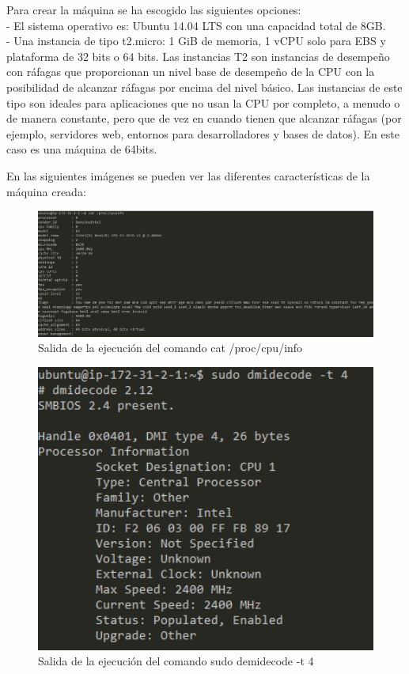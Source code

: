 Para crear la máquina se ha escogido las siguientes opciones:\\
- El sistema operativo es: Ubuntu 14.04 LTS con una capacidad total de 8GB.\\
- Una instancia de tipo t2.micro: 1 GiB de memoria, 1 vCPU solo para EBS y plataforma de 32 bits o 64 bits. Las instancias T2 son instancias de desempeño con ráfagas que proporcionan un nivel base de desempeño de la CPU con la posibilidad de alcanzar ráfagas por encima del nivel básico. Las instancias de este tipo son ideales para aplicaciones que no usan la CPU por completo, a menudo o de manera constante, pero que de vez en cuando tienen que alcanzar ráfagas (por ejemplo, servidores web, entornos para desarrolladores y bases de datos). En este caso es una máquina de 64bits.

En las siguientes imágenes se pueden ver las diferentes características de la máquina creada:
\begin{figure}[H]
   \centering
   \includegraphics[width=12cm]{img/cpuinfo}
   \caption{Salida de la ejecución del comando cat /proc/cpu/info }
   \label{figura:cpuinfo}
\end{figure}
\begin{figure}[H]
   \centering
   \includegraphics[width=12cm]{img/dmidecode}
   \caption{Salida de la ejecución del comando sudo demidecode -t 4}
   \label{figura:dmidecode}
\end{figure}

